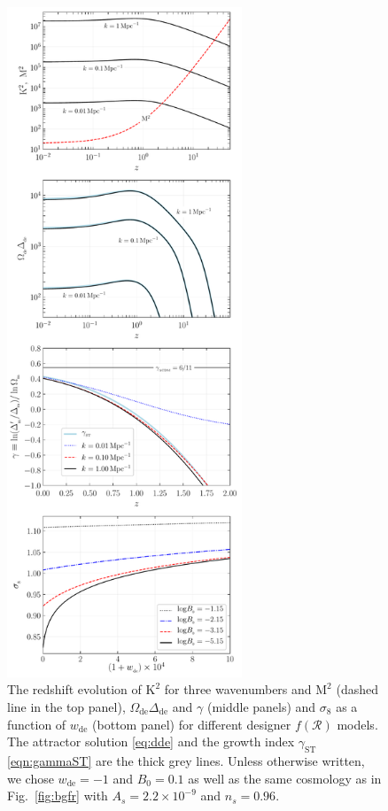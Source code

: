 \documentclass[nofootinbib,a4paper,aps,prd,10pt,superscriptaddress,reprint,showkeys,showpacs]{revtex4-1}
\newcommand{\qsubrm}[2]{{#1}_{\scriptscriptstyle{\textrm{#2}}}}
\begin{document}
\begin{figure}
 \begin{center}
  \includegraphics[width=7cm,angle=0]{fig2.pdf}
  \caption[justified]{The redshift evolution of $\mathrm{K}^2$ for three wavenumbers and $\mathrm{M}^2$ (dashed line in 
  the top panel), $\qsubrm{\Omega}{de}\qsubrm{\Delta}{de}$ and $\gamma$ (middle panels) and $\qsubrm{\sigma}{8}$ as a 
  function of $\qsubrm{w}{de}$ (bottom panel) for different designer $f(\mathcal{R})$ models. The attractor solution 
  \eqref{eq:dde} and the growth index $\qsubrm{\gamma}{ST}$ \eqref{eqn:gammaST} are the thick grey lines. Unless 
  otherwise written, we chose $\qsubrm{w}{de}=-1$ and $\qsubrm{B}{0}=0.1$ as well as the same cosmology as in 
  Fig.~\ref{fig:bgfr} with $A_s=2.2\times 10^{-9}$ and $n_s=0.96$.}
  \label{fig:deltade}
 \end{center}
\end{figure}
\end{document}
